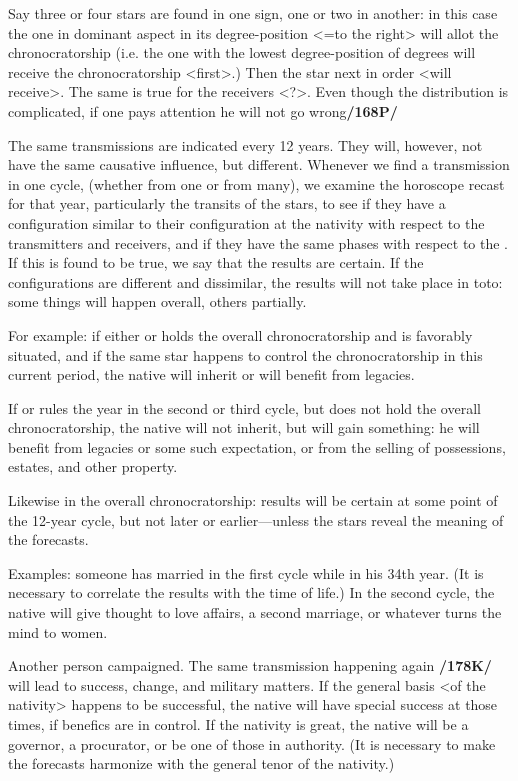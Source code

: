 Say three or four stars are found in one sign, one or two in another: in this case the one in dominant aspect in its degree-position <=to the right> will allot the chronocratorship (i.e. the one with the lowest degree-position of degrees will receive the chronocratorship <first>.) Then the star next in order <will receive>. The same is true for the receivers <?>. Even though the distribution is complicated, if one pays attention he will not go wrong\textbf{/168P/}

The same transmissions are indicated every 12 years. They will, however, not have the same causative influence, but different. Whenever we find a transmission in one cycle, (whether from one or from many), we examine the horoscope recast for that year, particularly the transits of the stars, to see if they have a configuration similar to their configuration at the nativity with respect to the transmitters and receivers, and if they have the same phases with respect to the \Sun. If this is found to be true, we say that the results are certain. If the configurations are different and dissimilar, the results will not take place in toto: some things will happen overall, others partially. 

For example: if either \Jupiter\xspace or \Saturn\xspace holds the overall chronocratorship and is favorably situated, and if the same star happens to control the chronocratorship in this current period, the native will inherit or will benefit from legacies. 

If \Saturn\xspace or \Jupiter\xspace rules the year in the second or third cycle, but does not hold the overall chronocratorship, the native will not inherit, but will gain something: he will benefit from legacies or some such expectation, or from the selling of possessions, estates, and other property. 

Likewise in the overall chronocratorship: results will be certain at some point of the 12-year cycle, but not later or earlier—unless the stars reveal the meaning of the forecasts.

Examples: someone has married in the first cycle while in his 34th year. \mndl (It is necessary to correlate the results with the time of life.) In the second cycle, the native will give thought to love affairs, a second marriage, or whatever turns the mind to women.

Another person campaigned. The same transmission happening again \textbf{/178K/} will lead to success, change, and military matters. If the general basis <of the nativity> happens to be successful, the native will have special success at those times, if benefics are in control. If the nativity is great, the native will be a governor, a procurator, or be one of those in authority. \mndl (It is necessary to make the forecasts harmonize with the general tenor of the nativity.)

